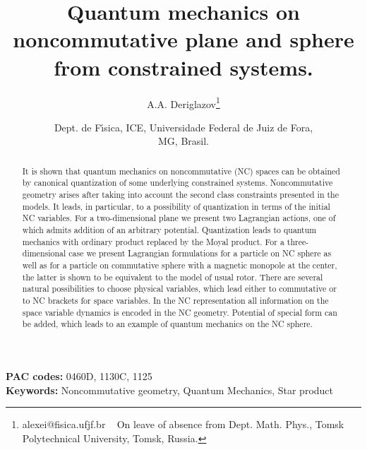 \documentclass[paper a4]{article}
\title{Quantum mechanics on noncommutative plane and sphere
from constrained systems.}
\author{A.A. Deriglazov\footnote{alexei@fisica.ufjf.br ~ On leave of
absence from Dept. Math. Phys., Tomsk Polytechnical University,
Tomsk, Russia.}}
\date{Dept. de F\'\i sica, ICE, Universidade Federal de Juiz de Fora,\\
MG, Brasil.}
\begin{document}
\maketitle
\large
\begin{abstract}
It is shown that quantum mechanics on noncommutative (NC) spaces
can be obtained by canonical quantization of some underlying
constrained systems.
Noncommutative geometry arises after taking into account the second
class constraints presented in the models.
It leads, in particular, to a possibility of
quantization in terms of the initial NC variables.
For a two-dimensional plane we present two Lagrangian actions,
one of which admits addition of an arbitrary potential.
Quantization leads to quantum mechanics with ordinary product replaced
by the Moyal product. For a three-dimensional case we present
Lagrangian formulations for a particle on NC sphere as well as for
a particle on commutative sphere with a magnetic monopole at the center,
the latter is shown to be equivalent to the model of usual rotor.
There are several natural possibilities to choose physical
variables, which lead either to commutative or to NC brackets for
space variables.
In the NC representation all information on the
space variable dynamics is encoded in the NC geometry. Potential
of special form can be added,
which leads to an example of quantum mechanics on the NC sphere.
\end{abstract}

{\bf PAC codes:} 0460D, 1130C, 1125 \\
{\bf Keywords:} Noncommutative geometry, Quantum Mechanics,
Star product\\

\noindent
\end{document}
